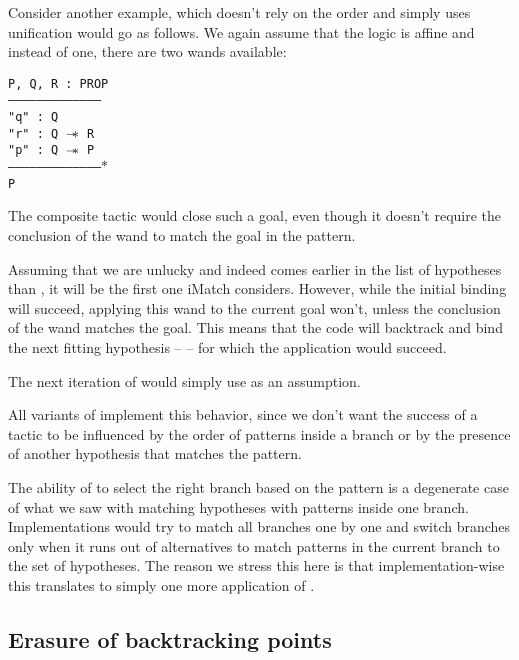 Consider another example, which doesn't rely on the order and simply uses unification would go as follows.
We again assume that the logic is affine and instead of one, there are two wands available:

\begin{minipage}{\linewidth}
\texttt{P, Q, R : PROP\\
---------------------------------------\\
"q" : Q\\
"r" : Q $\mathrel{-\mkern-6mu*}$ R\\
"p" : Q $\mathrel{-\mkern-6mu*}$ P\\
--------------------------------------$\ast$\\
P
}
\end{minipage}

The composite tactic  would close such a goal, even though it doesn't require the conclusion of the wand to match the goal in the pattern.

Assuming that we are unlucky and  indeed comes earlier in the list of hypotheses than , it will be the first one iMatch considers.
However, while the initial binding will succeed, applying this wand to the current goal won't, unless the conclusion of the wand matches the goal.
This means that the code will backtrack and bind the next fitting hypothesis --  -- for which the application would succeed.

The next iteration of  would simply use  as an assumption.

All variants of  implement this behavior, since we don't want the success of a tactic to be influenced by the order of patterns inside a branch or by the presence of another hypothesis that matches the pattern.

The ability of  to select the right branch based on the pattern is a degenerate case of what we saw with matching hypotheses with patterns inside one branch.
Implementations would try to match all branches one by one and switch branches only when it runs out of alternatives to match patterns in the current branch to the set of hypotheses.
The reason we stress this here is that implementation-wise this translates to simply one more application of .

\subsection{Erasure of backtracking points}

